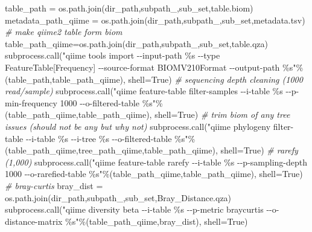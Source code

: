 \documentclass[
]{article}
\newenvironment{Shaded}{}{}
\newcommand{\CommentTok}[1]{\textcolor[rgb]{0.63,0.63,0.65}{\textit{#1}}}
\newcommand{\NormalTok}[1]{\textcolor[rgb]{0.22,0.23,0.26}{#1}}
\newcommand{\OperatorTok}[1]{\textcolor[rgb]{0.65,0.15,0.64}{#1}}
\newcommand{\SpecialCharTok}[1]{\textcolor[rgb]{0.00,0.52,0.74}{#1}}
\newcommand{\StringTok}[1]{\textcolor[rgb]{0.31,0.63,0.31}{#1}}
\newcommand{\VariableTok}[1]{\textcolor[rgb]{0.89,0.34,0.29}{#1}}
\begin{document}
\begin{Shaded}
\begin{Highlighting}[numbers=left,,firstnumber=33,]
\NormalTok{table\_path }\OperatorTok{=}\NormalTok{ os.path.join(dir\_path,subpath\_,sub\_set,}\StringTok{\textquotesingle{}table.biom\textquotesingle{}}\NormalTok{)}
\NormalTok{metadata\_path\_qiime }\OperatorTok{=}\NormalTok{ os.path.join(dir\_path,subpath\_,sub\_set,}\StringTok{\textquotesingle{}metadata.tsv\textquotesingle{}}\NormalTok{)  }
\CommentTok{\# make qiime2 table form biom }
\NormalTok{table\_path\_qiime}\OperatorTok{=}\NormalTok{os.path.join(dir\_path,subpath\_,sub\_set,}\StringTok{\textquotesingle{}table.qza\textquotesingle{}}\NormalTok{)}
\NormalTok{subprocess.call(}\StringTok{"qiime tools import {-}{-}input{-}path }\SpecialCharTok{\%s}\StringTok{ {-}{-}type \textquotesingle{}FeatureTable[Frequency]\textquotesingle{} {-}{-}source{-}format BIOMV210Format {-}{-}output{-}path }\SpecialCharTok{\%s}\StringTok{"}\OperatorTok{\%}\NormalTok{(table\_path,table\_path\_qiime), shell}\OperatorTok{=}\VariableTok{True}\NormalTok{)}
\CommentTok{\# sequencing depth cleaning (1000 read/sample)}
\NormalTok{subprocess.call(}\StringTok{"qiime feature{-}table filter{-}samples {-}{-}i{-}table }\SpecialCharTok{\%s}\StringTok{ {-}{-}p{-}min{-}frequency 1000 {-}{-}o{-}filtered{-}table }\SpecialCharTok{\%s}\StringTok{"}\OperatorTok{\%}\NormalTok{(table\_path\_qiime,table\_path\_qiime), shell}\OperatorTok{=}\VariableTok{True}\NormalTok{)}
\CommentTok{\# trim biom of any tree issues (should not be any but why not)}
\NormalTok{subprocess.call(}\StringTok{"qiime phylogeny filter{-}table {-}{-}i{-}table }\SpecialCharTok{\%s}\StringTok{ {-}{-}i{-}tree }\SpecialCharTok{\%s}\StringTok{ {-}{-}o{-}filtered{-}table }\SpecialCharTok{\%s}\StringTok{"}\OperatorTok{\%}\NormalTok{(table\_path\_qiime,tree\_path\_qiime,table\_path\_qiime), shell}\OperatorTok{=}\VariableTok{True}\NormalTok{)}
\CommentTok{\# rarefy (1,000)}
\NormalTok{subprocess.call(}\StringTok{"qiime feature{-}table rarefy {-}{-}i{-}table }\SpecialCharTok{\%s}\StringTok{ {-}{-}p{-}sampling{-}depth 1000 {-}{-}o{-}rarefied{-}table }\SpecialCharTok{\%s}\StringTok{"}\OperatorTok{\%}\NormalTok{(table\_path\_qiime,table\_path\_qiime), shell}\OperatorTok{=}\VariableTok{True}\NormalTok{)}
\CommentTok{\# bray{-}curtis}
\NormalTok{bray\_dist }\OperatorTok{=}\NormalTok{ os.path.join(dir\_path,subpath\_,sub\_set,}\StringTok{\textquotesingle{}Bray\_Distance.qza\textquotesingle{}}\NormalTok{)}
\NormalTok{subprocess.call(}\StringTok{"qiime diversity beta {-}{-}i{-}table }\SpecialCharTok{\%s}\StringTok{ {-}{-}p{-}metric \textquotesingle{}braycurtis\textquotesingle{} {-}{-}o{-}distance{-}matrix }\SpecialCharTok{\%s}\StringTok{"}\OperatorTok{\%}\NormalTok{(table\_path\_qiime,bray\_dist), shell}\OperatorTok{=}\VariableTok{True}\NormalTok{)}

\end{Highlighting}
\end{Shaded}
\end{document}
